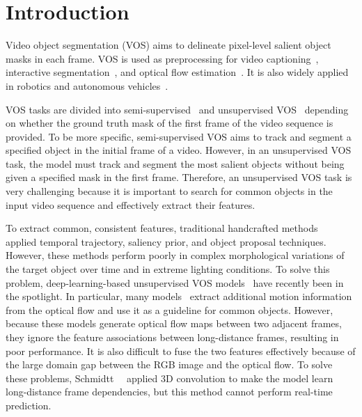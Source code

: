 \documentclass[10pt,twocolumn,letterpaper]{article}
\begin{document}
\section{Introduction}
Video object segmentation (VOS) aims to delineate pixel-level salient object masks in each frame. VOS is used as preprocessing for video captioning~\cite{wang2018reconstruction}, interactive segmentation~\cite{sofiiuk2020f}, and optical flow estimation~\cite{cheng2017segflow}. It is also widely applied in robotics and autonomous vehicles~\cite{abramov2012depth, liu2020video, maddern20171}.

VOS tasks are divided into semi-supervised~\cite{cho2022pixel, mao2021joint, xie2021efficient} and unsupervised VOS~\cite{fragkiadaki2015learning, tokmakov2017learning, zhou2020motion, ji2021full} depending on whether the ground truth mask of the first frame of the video sequence is provided. To be more specific, semi-supervised VOS aims to track and segment a specified object in the initial frame of a video. However, in an unsupervised VOS task, the model must track and segment the most salient objects without being given a specified mask in the first frame. Therefore, an unsupervised VOS task is very challenging because it is important to search for common objects in the input video sequence and effectively extract their features.

To extract common, consistent features, traditional handcrafted methods~\cite{papazoglou2013fast, faktor2014video, zhou2016video, wang2015saliency, ochs2013segmentation} applied temporal trajectory, saliency prior, and object proposal techniques. However, these methods perform poorly in complex morphological variations of the target object over time and in extreme lighting conditions. To solve this problem, deep-learning-based unsupervised VOS models~\cite{fragkiadaki2015learning, tokmakov2017learning, zhou2020motion, ji2021full, lee2021iteratively, chen2022video} have recently been in the spotlight. In particular, many models~\cite{fragkiadaki2015learning, tokmakov2017learning, zhou2020motion, ji2021full} extract additional motion information from the optical flow and use it as a guideline for common objects. However, because these models generate optical flow maps between two adjacent frames, they ignore the feature associations between long-distance frames, resulting in poor performance. It is also difficult to fuse the two features effectively because of the large domain gap between the RGB image and the optical flow. To solve these problems, Schmidtt~\etal~\cite{schmidt2022d2conv3d} applied 3D convolution to make the model learn long-distance frame dependencies, but this method cannot perform real-time prediction.
\end{document}
